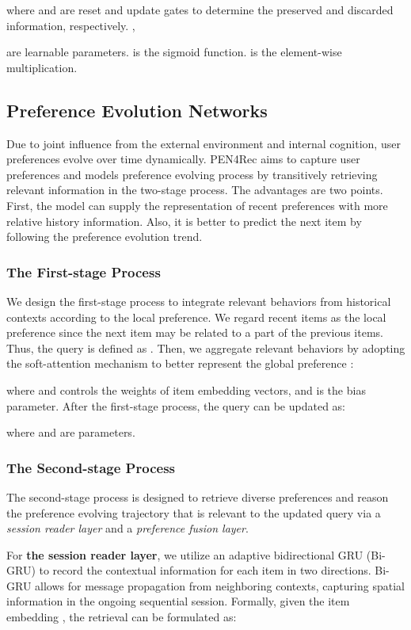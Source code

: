 \documentclass[runningheads]{llncs}
\begin{document}
 where 
 and  are reset and update gates to determine the preserved and discarded information, respectively.
 , 
  
 are learnable parameters.
  is the sigmoid function.
  is the element-wise multiplication.
 
 


\subsection{Preference Evolution Networks}
Due to joint influence from the external environment and internal cognition, user preferences evolve over time dynamically.
PEN4Rec aims to capture user preferences and models preference evolving process by transitively retrieving relevant information in the two-stage process.
The advantages are two points. First, the model can supply the representation of recent preferences with more relative history information. Also, it is better to predict the next item by following the preference evolution trend.



\subsubsection{The First-stage Process} 
We design {the first-stage process} to integrate relevant behaviors from historical contexts according to the local preference. We regard recent  items as the local preference since the next item may be related to a part of the previous  items. Thus, the query is defined as .
Then, we aggregate relevant behaviors by adopting the soft-attention mechanism to better represent the global preference :

where  and   controls the weights of item embedding vectors, and  is the bias parameter. 
After the first-stage process, the query can be updated as:
 
where  and  are parameters.

\subsubsection{The Second-stage Process}  
The second-stage process is designed to retrieve diverse preferences and reason the preference evolving trajectory that is relevant to the updated query via a {\it session reader layer} and a {\it preference fusion layer}. 

For {\bf the session reader layer}, we utilize an adaptive bidirectional GRU (Bi-GRU) to record the contextual information for each item in two directions.
Bi-GRU allows for message propagation from neighboring contexts, capturing spatial information in the ongoing sequential session.
Formally, given the item embedding  , the retrieval can be formulated as:
\end{document}
